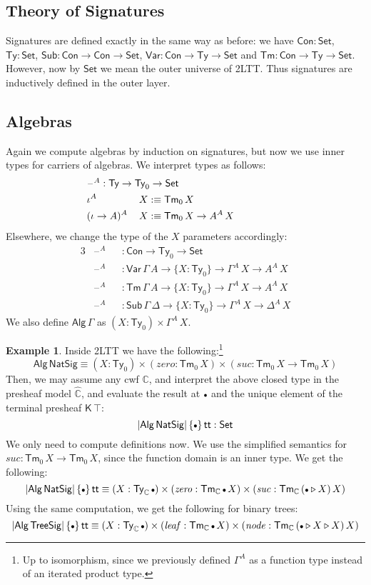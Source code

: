 \documentclass[12pt,a4paper,twoside,openany]{book}
\theoremstyle{remark}
\theoremstyle{definition}
\newtheorem{myexample}{Example}
\theoremstyle{theorem}
\newcommand{\mi}[1]{\mathit{#1}}
\newcommand{\ms}[1]{\mathsf{#1}}
\newcommand{\mbb}[1]{\mathbb{#1}}
\newcommand{\Con}{\mathsf{Con}}
\newcommand{\Sub}{\mathsf{Sub}}
\newcommand{\Tm}{\mathsf{Tm}}
\newcommand{\Ty}{\mathsf{Ty}}
\renewcommand{\tt}{\mathsf{tt}}
\newcommand{\blank}{\mathord{\hspace{1pt}\text{--}\hspace{1pt}}}
\newcommand{\Set}{\mathsf{Set}}
\newcommand{\ext}{\triangleright}
\newcommand{\emptycon}{\scaleobj{.75}\bullet}
\newcommand{\K}{\mathsf{K}}
\newcommand{\Var}{\ms{Var}}
\newcommand{\Alg}{\ms{Alg}}
\newcommand{\mbbC}{\mbb{C}}
\newcommand{\hmbbC}{\hat{\mbb{C}}}
\newcommand{\defn}{:\equiv}
\begin{document}
\subsection{Theory of Signatures}
Signatures are defined exactly in the same way as before: we have $\Con : \Set$,
$\Ty : \Set$, $\Sub : \Con \to \Con \to \Set$, $\Var : \Con \to \Ty \to \Set$ and
$\Tm : \Con \to \Ty \to \Set$. However, now by $\Set$ we mean the outer universe
of 2LTT. Thus signatures are inductively defined in the outer layer.

\subsection{Algebras}

Again we compute algebras by induction on signatures, but now we use inner
types for carriers of algebras. We interpret types as follows:
\begin{alignat*}{3}
& \hspace{-4em} \rlap{$\blank^A : \Ty \to \Ty_0 \to \Set$} \\
& \hspace{-4em} \iota^A\,&&X \defn \Tm_0\,X \\
& \hspace{-4em} (\iota\to A)^A\,&&X \defn \Tm_0\,X \to A^A\,X
\end{alignat*}
Elsewhere, we change the type of the $X$ parameters accordingly:
\begin{alignat*}{3}
& \blank^A &&: \Con \to \Ty_0 \to \Set\\
& \blank^A &&: \Var\,\Gamma\,A \to \{X : \Ty_0\} \to \Gamma^A\,X \to A^A\,X\\
& \blank^A &&: \Tm\,\Gamma\,A \to \{X : \Ty_0\} \to \Gamma^A\,X \to A^A\,X\\
& \blank^A &&: \Sub\,\Gamma\,\Delta \to \{X : \Ty_0\} \to \Gamma^A\,X \to \Delta^A\,X
\end{alignat*}
We also define $\ms{Alg}\,\Gamma$ as $(X : \Ty_0) \times \Gamma^A\,X$.

\begin{myexample}
Inside 2LTT we have the following:\footnote{Up to isomorphism, since we previously defined $\Gamma^A$ as a function type instead of an iterated product type.}
\[ \Alg\,\ms{NatSig} \equiv (X : \Ty_0)\times(\mi{zero} : \Tm_0\,X)\times(\mi{suc} : \Tm_0\,X \to \Tm_0\,X) \]
Then, we may assume any cwf $\mbbC$, and interpret the above closed type in the
presheaf model $\hmbbC$, and evaluate the result at $\emptycon$ and
the unique element of the terminal presheaf $\K\,\top$:
\[
  |\Alg\,\ms{NatSig}|\,\{\emptycon\}\,\tt : \Set
\]
We only need to compute definitions now. We use the simplified semantics for
$\mi{suc} : \Tm_0\,X \to \Tm_0\,X$, since the function domain is an inner
type. We get the following:
\[
|\Alg\,\ms{NatSig}|\,\{\emptycon\}\,\tt \equiv
(X : \Ty_{\mbbC}\,\emptycon) \times (\mi{zero} : \Tm_{\mbbC}\,\emptycon\,X) \times (\mi{suc} : \Tm_{\mbbC}\,(\emptycon \ext X)\,X)
\]
Using the same computation, we get the following for binary trees:
\[
|\Alg\,\ms{TreeSig}|\,\{\emptycon\}\,\tt \equiv
(X : \Ty_{\mbbC}\,\emptycon) \times (\mi{leaf} : \Tm_{\mbbC}\,\emptycon\,X) \times (\mi{node} : \Tm_{\mbbC}\,(\emptycon \ext X \ext X)\,X)
\]
\end{myexample}
\end{document}
